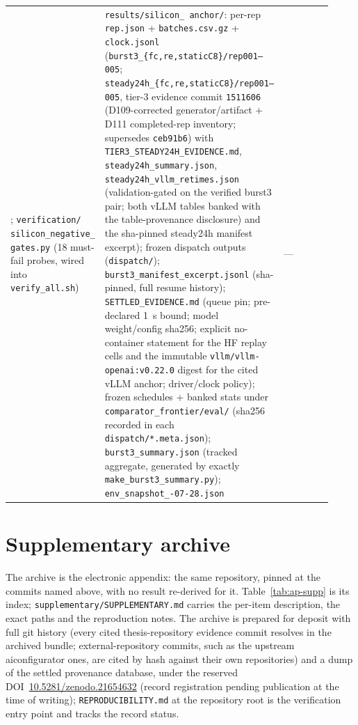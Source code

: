 {\begin{longtable}{@{}>{\raggedright\arraybackslash}p{0.215\linewidth}>{\raggedright\arraybackslash}p{0.245\linewidth}>{\raggedright\arraybackslash}p{0.30\linewidth}>{\raggedright\arraybackslash}p{0.155\linewidth}@{}}
{  \{runner,extract\}.py};
  \texttt{verification/ silicon\_\allowbreak negative\_\allowbreak
  gates.py} (18 must-fail probes, wired into \texttt{verify\_all.sh}) &
  \texttt{results/silicon\_ anchor/}: per-rep \texttt{rep.json} +
  \texttt{batches.csv.gz} + \texttt{clock.jsonl}
  (\texttt{burst3\_\allowbreak\{fc,re,staticC8\}/rep001--005};
  \texttt{steady24h\_\allowbreak\{fc,re,staticC8\}/rep001--005},
  tier-3 evidence commit \texttt{1511606} (D109-corrected
  generator/artifact + D111 completed-rep inventory; supersedes
  \texttt{ceb91b6}) with
  \texttt{TIER3\_\allowbreak STEADY24H\_\allowbreak EVIDENCE.md},
  \texttt{steady24h\_\allowbreak summary.json},
  \texttt{steady24h\_\allowbreak vllm\_\allowbreak retimes.json}
  (validation-gated on the verified burst3 pair; both vLLM tables banked
  with the table-provenance disclosure) and the sha-pinned steady24h
  manifest excerpt);
  frozen dispatch outputs (\texttt{dispatch/});
  \texttt{burst3\_\allowbreak manifest\_\allowbreak excerpt.jsonl}
  (sha-pinned, full resume history);
  \texttt{SETTLED\_\allowbreak EVIDENCE.md} (queue pin; pre-declared
  \SI{1}{\second} bound; model weight/config sha256; explicit
  no-container statement for the HF replay cells and the immutable
  \texttt{vllm/vllm-openai:v0.22.0} digest for the cited vLLM anchor;
  driver/clock policy); frozen schedules + banked stats under
  \texttt{comparator\_\allowbreak frontier/eval/} (sha256 recorded in each
  \texttt{dispatch/*.meta.json});
  \texttt{burst3\_\allowbreak summary.json} (tracked aggregate, generated
  by exactly \texttt{make\_\allowbreak burst3\_\allowbreak summary.py});
  \texttt{env\_\allowbreak snapshot\_\allowbreak 2026-07-28.json} &
  --- \\
\end{longtable}}

\section{Supplementary archive}
\label{sec:ap-supp}

The archive is the electronic appendix: the same repository, pinned at the
commits named above, with no result re-derived for it. Table~\ref{tab:ap-supp}
is its index; \texttt{supplementary/\allowbreak SUPPLEMENTARY.md} carries the
per-item description, the exact paths and the reproduction notes. The
archive is prepared for deposit with full git history (every cited
thesis-repository evidence commit resolves in the archived bundle;
external-repository commits, such as the upstream aiconfigurator ones, are
cited by hash against their own repositories) and a dump of the settled
provenance database, under the reserved
DOI~\href{https://doi.org/10.5281/zenodo.21654632}{10.5281/zenodo.21654632}
(record registration pending publication at the time of writing);
\texttt{REPRODUCIBILITY.md} at the repository root is the verification
entry point and tracks the record status.

